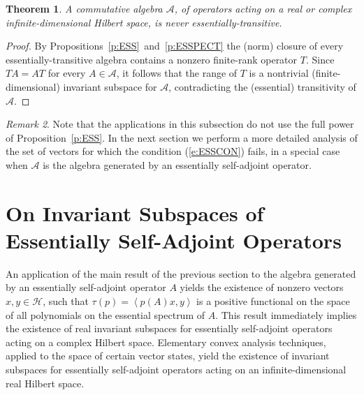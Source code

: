 \documentclass{tran-l}
\newtheorem{thm}{Theorem}[subsection]
\theoremstyle{definition}
\theoremstyle{remark}
\newtheorem{rem}[thm]{Remark}
\numberwithin{equation}{subsection}
\newcommand{\h}{\mathcal{H}}
\newcommand{\A}{\mathcal{A}}
\newcommand{\seq}[1]{\left<#1\right>}
\begin{document}
\begin{thm}\label{t:COMBURN}
A commutative algebra $\A$, of operators acting on a real or complex infinite-dimensional Hilbert space, is \emph{never} essentially-transitive.
\end{thm}

\begin{proof}
By Propositions~\ref{p:ESS}~and~\ref{p:ESSPECT} the (norm) closure of every essentially-transitive algebra contains a nonzero finite-rank operator $T$. Since $T{A}=A{T}$ for every $A\in\A$, it follows that the range of $T$ is a nontrivial (finite-dimensional) invariant subspace for $\A$, contradicting the (essential) transitivity of $\A$.
\end{proof}

\begin{rem}
Note that the applications in this subsection do not use the full power of Proposition~\ref{p:ESS}. In the next section we perform a more detailed analysis of the set of vectors for which the condition (\ref{e:ESSCON}) fails, in a special case when $\A$ is the algebra generated by an essentially self-adjoint operator.
\end{rem}

\section{On Invariant Subspaces of Essentially Self-Adjoint Operators}

An application of the main result of the previous section to the algebra generated by an essentially self-adjoint operator $A$ yields the existence of nonzero vectors $x,y\in\h$, such that $\tau(p)=\seq{p(A)x,y}$ is a positive functional on the space of all polynomials on the essential spectrum of $A$. This result immediately implies the existence of real invariant subspaces for essentially self-adjoint operators acting on a complex Hilbert space. Elementary convex analysis techniques, applied to the space of certain vector states, yield the existence of invariant subspaces for essentially self-adjoint operators acting on an infinite-dimensional real Hilbert space.
\end{document}
